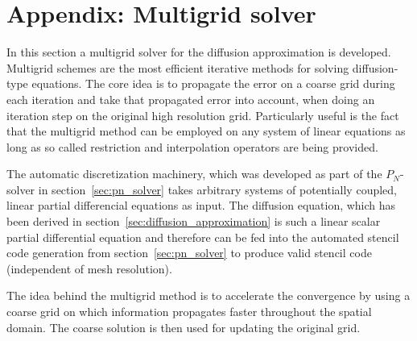 \chapter{Appendix: Multigrid solver}
\label{sec:da_solver}

In this section a multigrid solver for the diffusion approximation is developed. Multigrid schemes are the most efficient iterative methods for solving diffusion-type equations. The core idea is to propagate the error on a coarse grid during each iteration and take that propagated error into account, when doing an iteration step on the original high resolution grid. Particularly useful is the fact that the multigrid method can be employed on any system of linear equations as long as so called restriction and interpolation operators are being provided. 

The automatic discretization machinery, which was developed as part of the $P_N$-solver in section~\ref{sec:pn_solver} takes arbitrary systems of potentially coupled, linear partial differencial equations as input. The diffusion equation, which has been derived in section~\ref{sec:diffusion_approximation} is such a linear scalar partial differential equation and therefore can be fed into the automated stencil code generation from section~\ref{sec:pn_solver} to produce valid stencil code (independent of mesh resolution).

The idea behind the multigrid method is to accelerate the convergence by using a coarse grid on which information propagates faster throughout the spatial domain. The coarse solution is then used for updating the original grid.

